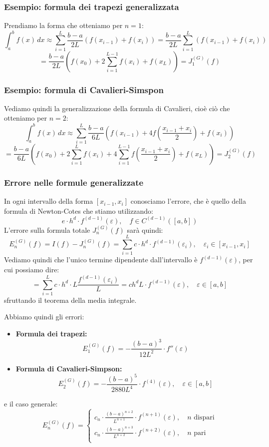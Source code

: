 \documentclass[a4paper,11pt]{article}
\begin{document}
\subsubsection{Esempio: formula dei trapezi generalizzata}
Prendiamo la forma che otteniamo per $n = 1$:
$$
\int_a^b f(x) \, dx \approx \sum_{i = 1}^L \frac{b - a}{2L} \left( f(x_{i - 1}) + f(x_i) \right) = \frac{b - a}{2L} \sum_{i = 1}^L \left( f(x_{i - 1}) + f(x_i) \right)
$$
$$
= \frac{b - a}{2L} \left( f(x_0) + 2 \sum_{i = 1}^{L - 1} f(x_i) + f(x_L) \right) = J_1^{(G)} (f)
$$

\subsubsection{Esempio: formula di Cavalieri-Simspon}
Vediamo quindi la generalizzazione della formula di Cavalieri, cioè ciò che otteniamo per $n = 2$:
$$
\int_a^b f(x) \, dx \approx \sum_{i = 1}^L \frac{b - a}{6L} \left( f(x_{i - 1}) + 4 f \left( \frac{x_{i - 1} + x_i}{2} \right) + f(x_i) \right)
$$
$$
= \frac{b - a}{6L} \left( f(x_0) + 2 \sum_{i = 1}^{L} f(x_i) + 4 \sum_{i = 1}^{L - 1} f\left( \frac{x_{i - 1} + x_i}{2} \right) + f(x_L) \right) = J_2^{(G)} (f)
$$

\subsubsection{Errore nelle formule generalizzate}
In ogni intervallo della forma $[x_{i - 1}, x_i]$ conosciamo l'errore, che è quello della formula di Newton-Cotes che stiamo utilizzando:
$$
e \cdot h^d \cdot f^{(d - 1)} (\varepsilon), \quad f \in C^{(d - 1)} ([a, b])
$$
L'errore sulla formula totale $J_n^{(G)}(f)$ sarà quindi:
$$
E_n^{(G)} (f) = I(f) - J_n^{(G)} (f) = \sum_{i = 1}^L c \cdot h^d \cdot f^{(d - 1)}(\varepsilon_i), \quad \varepsilon_i \in [x_{i - 1}, x_i]
$$
Vediamo quindi che l'unico termine dipendente dall'intervallo è $f^{(d - 1)} (\varepsilon)$, per cui possiamo dire:
$$
= \sum_{i = 1}^L c \cdot h^d \cdot L \frac{f^{(d - 1)}(\varepsilon_i)}{L} = c h^dL \cdot f^{(d - 1)} (\varepsilon), \quad \varepsilon \in [a, b]
$$
sfruttando il teorema della media integrale.

Abbiamo quindi gli errori:
\begin{itemize}
	\item \textbf{Formula dei trapezi:}
		$$
		E_1^{(G)}(f) = -\frac{(b - a)^3}{12L^2} \cdot f''(\varepsilon)
		$$
	\item \textbf{Formula di Cavalieri-Simpson:}
		$$
		E_2^{(G)}(f) = -\frac{(b - a)^5}{2880L^4} \cdot f^{(4)} (\varepsilon), \quad \varepsilon \in [a, b]
		$$
\end{itemize}
e il caso generale:
$$
E_n^{(G)} (f) =
\begin{cases}
	c_n \cdot \frac{(b - a)^{n + 2}}{L^{n + 1}} \cdot f^{(n + 1)} (\varepsilon), \quad n \text{ dispari} \\
	c_n \cdot \frac{(b - a)^{n + 3}}{L^{n + 2}} \cdot f^{(n + 2)} (\varepsilon), \quad n \text{ pari} \\
\end{cases}
$$
\end{document}
